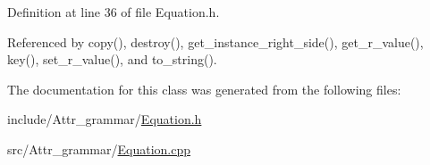 Definition at line 36 of file Equation.h.

Referenced by copy(), destroy(), get\_\-instance\_\-right\_\-side(), get\_\-r\_\-value(), key(), set\_\-r\_\-value(), and to\_\-string().

The documentation for this class was generated from the following files:\begin{CompactItemize}
\item 
include/Attr\_\-grammar/\hyperlink{Equation_8h}{Equation.h}\item 
src/Attr\_\-grammar/\hyperlink{Equation_8cpp}{Equation.cpp}\end{CompactItemize}
